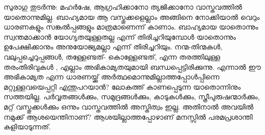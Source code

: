 സുരാഗു തുടര്‍ന്നു: മഹര്‍ഷേ, ആഗ്രഹിക്കാനോ ത്യജിക്കാനോ വാസ്തവത്തില്‍ യാതൊന്നുമില്ല. ബാഹ്യമായ ആ വസ്തുക്കളെല്ലാം അങ്ങിനെ നോക്കിയാല്‍ വെറും ധാരണകളും സങ്കല്‍പ്പങ്ങളും മാത്രമാണെന്ന് കാണാം. ബാഹ്യമായ യാതൊന്നും സ്വന്തമാക്കാന്‍ യോഗ്യതയുള്ളതല്ല എന്ന് തിരിച്ചറിയുമ്പോള്‍ യാതൊന്നും ഉപേക്ഷിക്കാനും അനുയോജ്യമല്ലാ എന്ന് തിരിച്ചറിയും. നന്മ-തിന്മകള്‍, വലുപ്പച്ചെറുപ്പങ്ങള്‍, തള്ളേണ്ടത്- കൊള്ളേണ്ടത്, എന്ന തരത്തിലുള്ള തരംതിരിവുകള്‍ , എല്ലാം അഭികാമ്യതയുമായി ബന്ധപ്പെട്ടിരിക്കുന്നു. എന്നാല്‍ ഈ അഭികാമ്യത എന്ന ധാരണയ്ക്ക് അര്‍ത്ഥമൊന്നുമില്ലാത്തപ്പോള്‍പ്പിന്നെ മറ്റുള്ളവയെപ്പറ്റി എന്തുപറയാന്‍? ലോകത്ത് കാണപ്പെടുന്ന യാതൊന്നിനും സത്തയില്ല. പര്‍വ്വതങ്ങള്‍ക്കും, സമുദ്രങ്ങള്‍ക്കും, കാടുകള്‍ക്കും, സ്ത്രീപുരുഷന്മാര്‍ക്കും, മറ്റ് വസ്തുക്കള്‍ക്കും ഒന്നും വാസ്തവത്തില്‍ അസ്തിത്വം ഇല്ല. അതിനാല്‍ അവയില്‍ നമുക്ക് ആശയെന്തിനാണ്? ആശയില്ലാത്തപ്പോഴാണ് മനസ്സില്‍ പരമപ്രശാന്തി കളിയാടുന്നത്.
